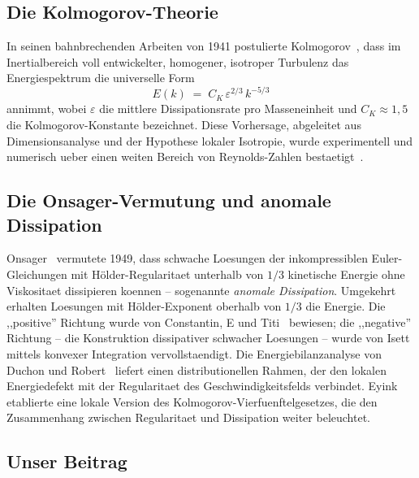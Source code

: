 \documentclass[12pt,a4paper]{article}
\theoremstyle{definition}
\theoremstyle{plain}
\theoremstyle{remark}
\begin{document}
\subsection{Die Kolmogorov-Theorie}

In seinen bahnbrechenden Arbeiten von 1941 postulierte
Kolmogorov~\cite{K41a,K41b}, dass im Inertialbereich voll entwickelter,
homogener, isotroper Turbulenz das Energiespektrum die universelle Form
\begin{equation}\label{eq:K41}
  E(k) \;=\; C_K \,\varepsilon^{2/3}\, k^{-5/3}
\end{equation}
annimmt, wobei $\varepsilon$ die mittlere Dissipationsrate pro
Masseneinheit und $C_K \approx 1{,}5$ die Kolmogorov-Konstante bezeichnet.
Diese Vorhersage, abgeleitet aus Dimensionsanalyse und der Hypothese
lokaler Isotropie, wurde experimentell und numerisch ueber einen weiten
Bereich von Reynolds-Zahlen bestaetigt~\cite{Frisch95,Pope00}.

\subsection{Die Onsager-Vermutung und anomale Dissipation}

Onsager~\cite{Onsager49} vermutete 1949, dass schwache Loesungen der
inkompressiblen Euler-Gleichungen mit H\"older-Regularitaet unterhalb
von $1/3$ kinetische Energie ohne Viskositaet dissipieren koennen --
sogenannte \emph{anomale Dissipation}. Umgekehrt erhalten Loesungen mit
H\"older-Exponent oberhalb von $1/3$ die Energie. Die ,,positive''
Richtung wurde von Constantin, E und Titi~\cite{CET94} bewiesen; die
,,negative'' Richtung -- die Konstruktion dissipativer schwacher
Loesungen -- wurde von Isett~\cite{Isett18} mittels konvexer Integration
vervollstaendigt. Die Energiebilanzanalyse von Duchon und
Robert~\cite{DR00} liefert einen distributionellen Rahmen, der den
lokalen Energiedefekt mit der Regularitaet des Geschwindigkeitsfelds
verbindet.  Eyink~\cite{Eyink03} etablierte eine lokale Version des
Kolmogorov-Vierfuenftelgesetzes, die den Zusammenhang zwischen
Regularitaet und Dissipation weiter beleuchtet.

\subsection{Unser Beitrag}
\end{document}
